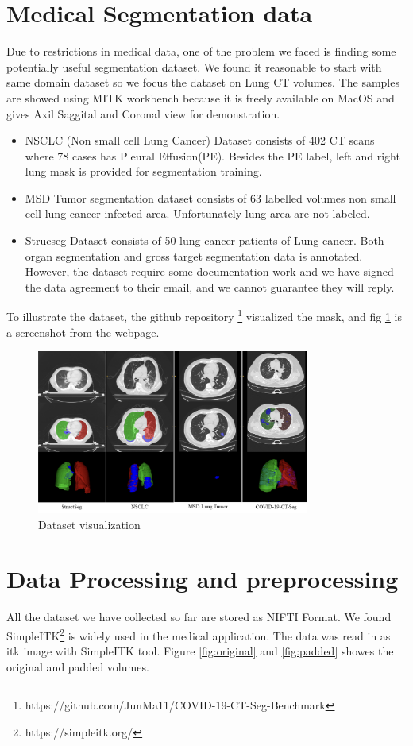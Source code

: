 \section{Medical Segmentation data}
Due to restrictions in medical data, one of the problem we faced is finding some potentially useful segmentation dataset. We found it reasonable to start with same domain dataset so we focus the dataset on Lung CT volumes. The samples are showed using MITK workbench because it is freely available on MacOS and gives Axil Saggital and Coronal view for demonstration.
\begin{itemize}
	\item NSCLC (Non small cell Lung Cancer) Dataset consists of 402 CT scans where 78 cases has Pleural Effusion(PE). Besides the PE label, left and right lung mask is provided for segmentation training.
	\item MSD Tumor segmentation dataset consists of 63 labelled volumes non small cell lung cancer infected area. Unfortunately lung area are not labeled.
	\item Strucseg Dataset consists of 50 lung cancer patients of Lung cancer. Both organ segmentation and gross target segmentation data is annotated. However, the dataset require some documentation work and we have signed the data agreement to their email, and we cannot guarantee they will reply.
	\end{itemize}
To illustrate the dataset, the github repository \footnote{https://github.com/JunMa11/COVID-19-CT-Seg-Benchmark} visualized the mask, and fig \ref{fig:visualize} is a screenshot from the webpage.
\begin{figure}
\centering
\includegraphics[width = 0.8\textwidth]{img/dataset_visualize.png}
\caption{Dataset visualization}
\label{fig:visualize}
\end{figure}

\section{Data Processing and preprocessing}
All the dataset we have collected so far are stored as NIFTI Format. We found SimpleITK\footnote{https://simpleitk.org/} is widely used in the medical application. The data was read in as itk image with SimpleITK tool. Figure \ref{fig:original} and \ref{fig:padded} showes the original and padded volumes.
